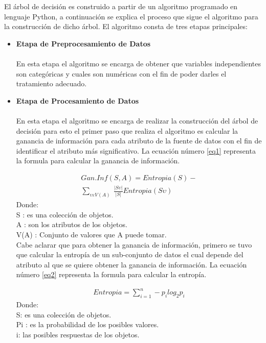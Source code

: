 \documentclass[letterpaper, 10 pt, conference]{ieeeconf}
\begin{document}
El árbol de decisión es construido a partir de un algoritmo programado en lenguaje Python, a continuación se explica el proceso que sigue el algoritmo para la construcción de dicho árbol. El algoritmo consta de tres etapas principales:\\

\begin{itemize}[leftmargin=*]
    \item \textbf{Etapa de Preprocesamiento de Datos}
    \\ \\ En esta etapa el algoritmo se encarga de obtener que variables independientes son categóricas y cuales son numéricas con el fin de poder darles el tratamiento adecuado.\\
    
    \item \textbf{Etapa de Procesamiento de Datos}
    \\ \\ En esta etapa el algoritmo se encarga de realizar la construcción del árbol de decisión para esto el primer paso que realiza el algoritmo es calcular la ganancia de información para cada atributo de la fuente de datos con el fin de identificar el atributo más significativo. La ecuación número \ref{eq1} representa la formula para calcular la ganancia de información.
    
    \begin{equation} \label{eq1}
    \begin{split}
    Gan. Inf(S,A) = Entropia(S) - \\\sum_{\upsilon \varepsilon V(A)}\ \frac{|S\upsilon|}{|S|}Entropia(S\upsilon)
    \end{split}
    \end{equation}
    Donde:\\
    S : es una colección de objetos.\\
    A : son los atributos de los objetos.\\
    V(A) : Conjunto de valores que A puede tomar.\\
    
    Cabe aclarar que para obtener la ganancia de información, primero se tuvo que calcular la entropía de un sub-conjunto de datos el cual depende del atributo al que se quiere obtener la ganancia de información. La ecuación número \ref{eq2} representa la formula para calcular la entropía.
    
    \begin{equation} \label{eq2}
    \begin{split}
    Entropia = \sum_{i=1}^{n} -p_{i} log_{2} p_{i}
    \end{split}
    \end{equation}
    Donde:\\
    S: es una colección de objetos.\\
    Pi : es la probabilidad de los posibles valores.\\
    i: las posibles respuestas de los objetos.\\


\end{itemize}
\end{document}
